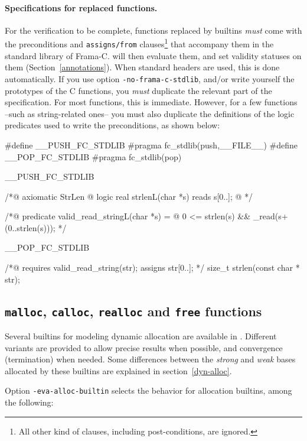 \documentclass{frama-c-book}
\begin{document}
\paragraph{Specifications for replaced functions.}

For the verification to be complete, functions replaced by builtins
\emph{must} come with the preconditions and \lstinline+assigns/from+
clauses\footnote{All other kind of clauses, including post-conditions,
  are ignored.}  that accompany them in the standard library of
Frama-C. \Eva{} will then evaluate them, and set validity statuses on
them (Section~\ref{annotations}).
%
When standard headers are used, this is done automatically. If you use
option \lstinline|-no-frama-c-stdlib|, and/or write yourself the
prototypes of the C functions, you \emph{must} duplicate the relevant
part of the specification. For most functions, this is
immediate. However, for a few functions --such as string-related
ones-- you must also duplicate the definitions of the logic predicates
used to write the preconditions, as shown below:
%
\begin{listing-nonumber}
#define __PUSH_FC_STDLIB #pragma fc_stdlib(push,__FILE__)
#define __POP_FC_STDLIB #pragma fc_stdlib(pop)

__PUSH_FC_STDLIB

/*@ axiomatic StrLen {
  @ logic real strlen{L}(char *s) reads s[0..];
  @ }
*/

/*@ predicate valid_read_string{L}(char *s) =
  @   0 <= strlen(s) && \valid_read(s+(0..strlen(s)));
*/

__POP_FC_STDLIB

/*@ requires valid_read_string(str);
    assigns \result \from str[0..]; */
size_t strlen(const char * str);
\end{listing-nonumber}


\subsection{{\tt malloc}, {\tt calloc}, {\tt realloc} and {\tt free} functions}
\label{malloc}

Several builtins for modeling dynamic allocation are available in \FramaC.
Different variants are provided to allow precise results when possible,
and convergence (termination) when needed. Some differences between the
\emph{strong} and \emph{weak} bases allocated by these builtins are
explained in section~\ref{dyn-alloc}.

Option \lstinline|-eva-alloc-builtin| selects the behavior for allocation
builtins, among the following:
\end{document}
